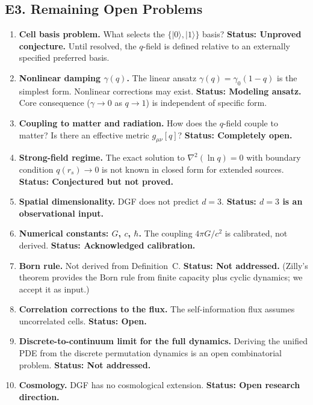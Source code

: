 \documentclass[reprint]{revtex4-2}
\begin{document}
\subsection{E3. Remaining Open Problems}

\begin{enumerate}[leftmargin=*, label=\textbf{OP-\arabic*:}]

\item \textbf{Cell basis problem.} What selects the $\{|0\rangle,|1\rangle\}$ basis? \textbf{Status: Unproved conjecture.} Until resolved, the $q$-field is defined relative to an externally specified preferred basis.

\item \textbf{Nonlinear damping $\gamma(q)$.} The linear ansatz $\gamma(q)=\gamma_0(1-q)$ is the simplest form. Nonlinear corrections may exist. \textbf{Status: Modeling ansatz.} Core consequence ($\gamma\to 0$ as $q\to 1$) is independent of specific form.

\item \textbf{Coupling to matter and radiation.} How does the $q$-field couple to matter? Is there an effective metric $g_{\mu\nu}[q]$? \textbf{Status: Completely open.}

\item \textbf{Strong-field regime.} The exact solution to $\nabla^2(\ln q)=0$ with boundary condition $q(r_s)\to 0$ is not known in closed form for extended sources. \textbf{Status: Conjectured but not proved.}

\item \textbf{Spatial dimensionality.} DGF does not predict $d=3$. \textbf{Status: $d=3$ is an observational input.}

\item \textbf{Numerical constants: $G$, $c$, $\hbar$.} The coupling $4\pi G/c^2$ is calibrated, not derived. \textbf{Status: Acknowledged calibration.}

\item \textbf{Born rule.} Not derived from Definition~C. \textbf{Status: Not addressed.} (Zilly's theorem provides the Born rule from finite capacity plus cyclic dynamics; we accept it as input.)

\item \textbf{Correlation corrections to the flux.} The self-information flux assumes uncorrelated cells. \textbf{Status: Open.}

\item \textbf{Discrete-to-continuum limit for the full dynamics.} Deriving the unified PDE from the discrete permutation dynamics is an open combinatorial problem. \textbf{Status: Not addressed.}

\item \textbf{Cosmology.} DGF has no cosmological extension. \textbf{Status: Open research direction.}

\end{enumerate}
\end{document}
